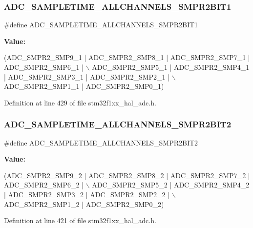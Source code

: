 \subsubsection{\texorpdfstring{A\+D\+C\+\_\+\+S\+A\+M\+P\+L\+E\+T\+I\+M\+E\+\_\+\+A\+L\+L\+C\+H\+A\+N\+N\+E\+L\+S\+\_\+\+S\+M\+P\+R2\+B\+I\+T1}{ADC\_SAMPLETIME\_ALLCHANNELS\_SMPR2BIT1}}
{\footnotesize\ttfamily \#define A\+D\+C\+\_\+\+S\+A\+M\+P\+L\+E\+T\+I\+M\+E\+\_\+\+A\+L\+L\+C\+H\+A\+N\+N\+E\+L\+S\+\_\+\+S\+M\+P\+R2\+B\+I\+T1}

{\bfseries Value\+:}
\begin{DoxyCode}
(ADC\_SMPR2\_SMP9\_1 | ADC\_SMPR2\_SMP8\_1 | ADC\_SMPR2\_SMP7\_1 | ADC\_SMPR2\_SMP6\_1 |     \(\backslash\)
      ADC\_SMPR2\_SMP5\_1 | ADC\_SMPR2\_SMP4\_1 | ADC\_SMPR2\_SMP3\_1 | ADC\_SMPR2\_SMP2\_1 |     \(\backslash\)
      ADC\_SMPR2\_SMP1\_1 | ADC\_SMPR2\_SMP0\_1)
\end{DoxyCode}


Definition at line 429 of file stm32f1xx\+\_\+hal\+\_\+adc.\+h.

\mbox{\label{group___a_d_c__sampling__times__all__channels_ga79d9b6d4fc9bb417c6449bf81ed3cad3}} 
\subsubsection{\texorpdfstring{A\+D\+C\+\_\+\+S\+A\+M\+P\+L\+E\+T\+I\+M\+E\+\_\+\+A\+L\+L\+C\+H\+A\+N\+N\+E\+L\+S\+\_\+\+S\+M\+P\+R2\+B\+I\+T2}{ADC\_SAMPLETIME\_ALLCHANNELS\_SMPR2BIT2}}
{\footnotesize\ttfamily \#define A\+D\+C\+\_\+\+S\+A\+M\+P\+L\+E\+T\+I\+M\+E\+\_\+\+A\+L\+L\+C\+H\+A\+N\+N\+E\+L\+S\+\_\+\+S\+M\+P\+R2\+B\+I\+T2}

{\bfseries Value\+:}
\begin{DoxyCode}
(ADC\_SMPR2\_SMP9\_2 | ADC\_SMPR2\_SMP8\_2 | ADC\_SMPR2\_SMP7\_2 | ADC\_SMPR2\_SMP6\_2 |     \(\backslash\)
      ADC\_SMPR2\_SMP5\_2 | ADC\_SMPR2\_SMP4\_2 | ADC\_SMPR2\_SMP3\_2 | ADC\_SMPR2\_SMP2\_2 |     \(\backslash\)
      ADC\_SMPR2\_SMP1\_2 | ADC\_SMPR2\_SMP0\_2)
\end{DoxyCode}


Definition at line 421 of file stm32f1xx\+\_\+hal\+\_\+adc.\+h.

